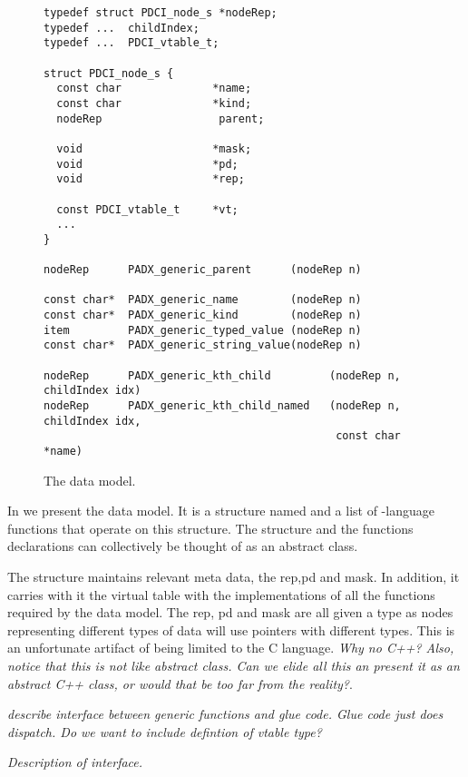 \begin{figure*}
{\small
\begin{verbatim}
typedef struct PDCI_node_s *nodeRep;
typedef ...  childIndex;
typedef ...  PDCI_vtable_t;

struct PDCI_node_s {
  const char              *name;
  const char              *kind;
  nodeRep                  parent;

  void                    *mask;
  void                    *pd;
  void                    *rep;

  const PDCI_vtable_t     *vt;
  ...
}

nodeRep      PADX_generic_parent      (nodeRep n)

const char*  PADX_generic_name        (nodeRep n)
const char*  PADX_generic_kind        (nodeRep n)
item         PADX_generic_typed_value (nodeRep n)
const char*  PADX_generic_string_value(nodeRep n)

nodeRep      PADX_generic_kth_child         (nodeRep n, childIndex idx)
nodeRep      PADX_generic_kth_child_named   (nodeRep n, childIndex idx, 
                                             const char *name)
\end{verbatim}
}
\caption{The \padx{} data model.}
\label{fig:generic-node-interface}
\end{figure*}

In  we present the \padx{} data
model. It is a structure named  and a list of \C{}-language
functions that operate on this structure. The structure and the
functions declarations can collectively be thought of as an abstract
class.

The  structure maintains \Xml{} relevant meta data, the
rep,pd and mask. In addition, it carries with it the virtual table
with the implementations of all the functions required by the \padx{}
data model. The rep, pd and mask are all given a  type as
nodes representing different types of data will use pointers with
different types. This is an unfortunate artifact of being limited to
the C language. {\em Why no C++? Also, notice that this is not like
  abstract class. Can we elide all this an present it as an abstract
  C++ class, or would that be too far from the reality?}.

{\em describe interface between generic functions and glue code. Glue
  code just does dispatch. Do we want to include defintion of vtable type?}

{\em Description of interface.}


